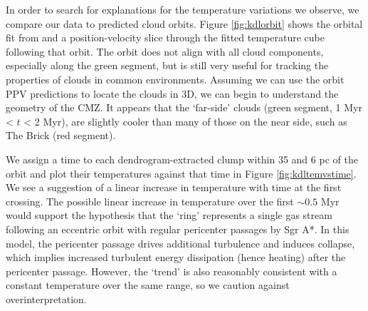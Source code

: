 In order to search for explanations for the temperature variations we observe,
we compare our data to predicted cloud orbits.  Figure \ref{fig:kdlorbit} shows
the orbital fit from \citet{Kruijssen2015a} and a position-velocity slice
through the fitted temperature cube following that orbit.  The orbit does not
align with all cloud components, especially along the green segment, but is still
very useful for
tracking the properties of clouds in common environments.  Assuming we can use
the orbit PPV predictions to locate the clouds in 3D, we can begin to
understand the geometry of the CMZ.  It appears that the
`far-side' clouds (green segment, 1 Myr < $t$ < 2 Myr), are slightly cooler
than many of those on the near side, such as The Brick (red segment).  


We assign a time to each dendrogram-extracted clump within 35 \kms and 6 pc of
the \citet{Kruijssen2015a} orbit and plot their temperatures against that time
in Figure \ref{fig:kdltemvstime}.  We see a suggestion of a linear increase in temperature
with time at the first crossing.  The possible linear increase in temperature
over the first $\sim0.5$ Myr would support the \citet{Kruijssen2015a} hypothesis
that the `ring' represents a single gas stream following an eccentric orbit
with regular pericenter passages by Sgr A*.
In this model, the pericenter passage drives additional turbulence and induces
collapse, which implies increased turbulent energy dissipation (hence heating)
after the pericenter passage.  However, the `trend' is also reasonably
consistent with a constant temperature over the same range, so we caution
against overinterpretation. 

